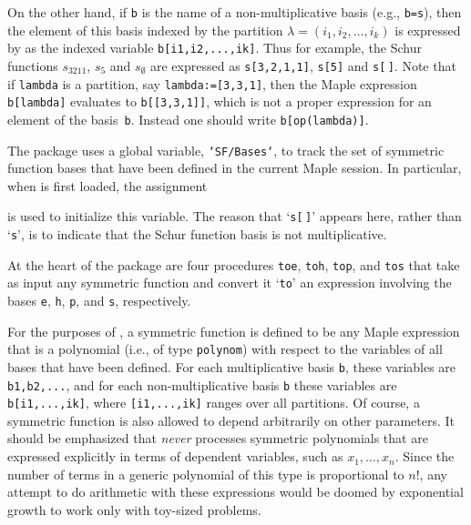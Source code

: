 On the other hand, if {\tt b} is the name of a non-multiplicative basis
(e.g., {\tt b=s}), then the element of this basis indexed by the partition
$\lambda=(i_1,i_2,\ldots,i_k)$ is expressed by \SF{} as the indexed
variable {\tt b[i\ul{}1,i\ul{}2,...,i\ul{}k]}. Thus for example, the Schur
functions $s_{3211}$, $s_5$ and $s_\emptyset$ are expressed as
{\tt s[3,2,1,1]}, {\tt s[5]} and {\tt s[$\,$]}. Note that if {\tt lambda}
is a partition, say {\tt lambda:=[3,3,1]}, then the Maple expression
{\tt b[lambda]} evaluates to {\tt b[[3,3,1]]}, which is not a proper
expression for an element of the basis~{\tt b}. Instead one should
write {\tt b[op(lambda)]}.

The \SF{} package uses a global variable, {\tt `SF/Bases`}, to track
the set of symmetric function bases that have been defined in the current
Maple session. In particular, when \SF{} is first loaded, the assignment


\noindent is used to initialize this variable. The reason that
`{\tt s[$\,$]}' appears here, rather than `{\tt s}', is to indicate that
the Schur function basis is not multiplicative.

At the heart of the \SF{} package are four procedures {\tt toe},
{\tt toh}, {\tt top}, and {\tt tos} that take as input any symmetric
function and convert it `{\tt to}' an expression involving the bases
{\tt e}, {\tt h}, {\tt p}, and {\tt s}, respectively.

For the purposes of \SF, a symmetric function is defined to be any
Maple expression that is a polynomial (i.e., of type {\tt polynom})
with respect to the variables of all bases that have been defined.
For each multiplicative basis {\tt b}, these variables
are {\tt b1,b2,...}, and for each non-multiplicative basis {\tt b} these
variables are {\tt b[i\ul{}1,...,i\ul{}k]},
where {\tt [i\ul{}1,...,i\ul{}k]} ranges over all partitions. Of course,
a symmetric function is also allowed to depend arbitrarily on other
parameters. It should be emphasized that \SF{} {\it never} processes
symmetric polynomials that are expressed explicitly in terms of dependent
variables, such as $x_1,\ldots,x_n$. Since the number of terms in
a generic polynomial of this type is proportional to $n!$, any attempt
to do arithmetic with these expressions would be doomed by exponential
growth to work only with toy-sized problems.

